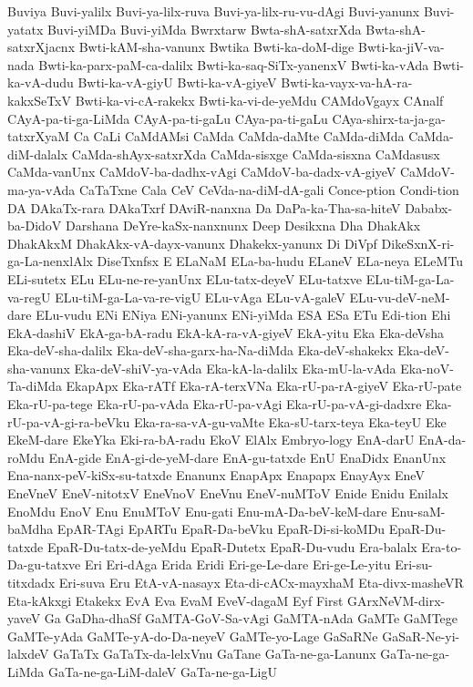 {Buviya
Buvi-yalilx
Buvi-ya-lilx-ruva
Buvi-ya-lilx-ru-vu-dAgi
Buvi-yanunx
Buvi-yatatx
Buvi-yiMDa
Buvi-yiMda
Bwrxtarw
Bwta-shA-satxrXda
Bwta-shA-satxrXjacnx
Bwti-kAM-sha-vanunx
Bwtika
Bwti-ka-doM-dige
Bwti-ka-jiV-va-nada
Bwti-ka-parx-paM-ca-dalilx
Bwti-ka-saq-SiTx-yanenxV
Bwti-ka-vAda
Bwti-ka-vA-dudu
Bwti-ka-vA-giyU
Bwti-ka-vA-giyeV
Bwti-ka-vayx-va-hA-ra-kakxSeTxV
Bwti-ka-vi-cA-rakekx
Bwti-ka-vi-de-yeMdu
CAMdoVgayx
CAnalf
CAyA-pa-ti-ga-LiMda
CAyA-pa-ti-gaLu
CAya-pa-ti-gaLu
CAya-shirx-ta-ja-ga-tatxrXyaM
Ca
CaLi
CaMdAMsi
CaMda
CaMda-daMte
CaMda-diMda
CaMda-diM-dalalx
CaMda-shAyx-satxrXda
CaMda-sisxge
CaMda-sisxna
CaMdasusx
CaMda-vanUnx
CaMdoV-ba-dadhx-vAgi
CaMdoV-ba-dadx-vA-giyeV
CaMdoV-ma-ya-vAda
CaTaTxne
Cala
CeV
CeVda-na-diM-dA-gali
Conce-ption
Condi-tion
DA
DAkaTx-rara
DAkaTxrf
DAviR-nanxna
Da
DaPa-ka-Tha-sa-hiteV
Dababx-ba-DidoV
Darshana
DeYre-kaSx-nanxnunx
Deep
Desikxna
Dha
DhakAkx
DhakAkxM
DhakAkx-vA-dayx-vanunx
Dhakekx-yanunx
Di
DiVpf
DikeSxnX-ri-ga-La-nenxlAlx
DiseTxnfsx
E
ELaNaM
ELa-ba-hudu
ELaneV
ELa-neya
ELeMTu
ELi-sutetx
ELu
ELu-ne-re-yanUnx
ELu-tatx-deyeV
ELu-tatxve
ELu-tiM-ga-La-va-regU
ELu-tiM-ga-La-va-re-vigU
ELu-vAga
ELu-vA-galeV
ELu-vu-deV-neM-dare
ELu-vudu
ENi
ENiya
ENi-yanunx
ENi-yiMda
ESA
ESa
ETu
Edi-tion
Ehi
EkA-dashiV
EkA-ga-bA-radu
EkA-kA-ra-vA-giyeV
EkA-yitu
Eka
Eka-deVsha
Eka-deV-sha-dalilx
Eka-deV-sha-garx-ha-Na-diMda
Eka-deV-shakekx
Eka-deV-sha-vanunx
Eka-deV-shiV-ya-vAda
Eka-kA-la-dalilx
Eka-mU-la-vAda
Eka-noV-Ta-diMda
EkapApx
Eka-rATf
Eka-rA-terxVNa
Eka-rU-pa-rA-giyeV
Eka-rU-pate
Eka-rU-pa-tege
Eka-rU-pa-vAda
Eka-rU-pa-vAgi
Eka-rU-pa-vA-gi-dadxre
Eka-rU-pa-vA-gi-ra-beVku
Eka-ra-sa-vA-gu-vaMte
Eka-sU-tarx-teya
Eka-teyU
Eke
EkeM-dare
EkeYka
Eki-ra-bA-radu
EkoV
ElAlx
Embryo-logy
EnA-darU
EnA-da-roMdu
EnA-gide
EnA-gi-de-yeM-dare
EnA-gu-tatxde
EnU
EnaDidx
EnanUnx
Ena-nanx-peV-kiSx-su-tatxde
Enanunx
EnapApx
Enapapx
EnayAyx
EneV
EneVneV
EneV-nitotxV
EneVnoV
EneVnu
EneV-nuMToV
Enide
Enidu
Enilalx
EnoMdu
EnoV
Enu
EnuMToV
Enu-gati
Enu-mA-Da-beV-keM-dare
Enu-saM-baMdha
EpAR-TAgi
EpARTu
EpaR-Da-beVku
EpaR-Di-si-koMDu
EpaR-Du-tatxde
EpaR-Du-tatx-de-yeMdu
EpaR-Dutetx
EpaR-Du-vudu
Era-balalx
Era-to-Da-gu-tatxve
Eri
Eri-dAga
Erida
Eridi
Eri-ge-Le-dare
Eri-ge-Le-yitu
Eri-su-titxdadx
Eri-suva
Eru
EtA-vA-nasayx
Eta-di-cACx-mayxhaM
Eta-divx-masheVR
Eta-kAkxgi
Etakekx
EvA
Eva
EvaM
EveV-dagaM
Eyf
First
GArxNeVM-dirx-yaveV
Ga
GaDha-dhaSf
GaMTA-GoV-Sa-vAgi
GaMTA-nAda
GaMTe
GaMTege
GaMTe-yAda
GaMTe-yA-do-Da-neyeV
GaMTe-yo-Lage
GaSaRNe
GaSaR-Ne-yi-lalxdeV
GaTaTx
GaTaTx-da-lelxVnu
GaTane
GaTa-ne-ga-Lanunx
GaTa-ne-ga-LiMda
GaTa-ne-ga-LiM-daleV
GaTa-ne-ga-LigU
}
